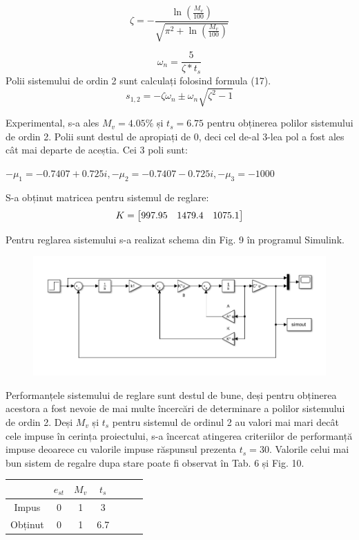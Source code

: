 \documentclass[11pt]{article}
\begin{document}
\begin{equation}
\zeta=-\frac{\ln(\frac{M_v}{100})}{\sqrt{\pi^2+\ln(\frac{M_v}{100})}}
\end{equation}

\begin{equation}
\omega_n=\frac{5}{\zeta\ast t_s}
\end{equation}
Polii sistemului de ordin 2 sunt calculați folosind formula (17).
\begin{equation}
s_{1,2}=-\zeta\omega_{n}\pm\omega_{n}\sqrt{\zeta^2-1}
\end{equation}

Experimental, s-a ales $M_v=4.05\%$ și $t_s=6.75$ pentru obținerea polilor sistemului de ordin 2. Polii sunt destul de apropiați de 0, deci cel de-al 3-lea pol a fost ales cât mai departe de aceștia. Cei 3 poli sunt:
\begin{center}
	$-\mu_1=-0.7407+0.725i,-\mu_2=-0.7407-0.725i,-\mu_3=-1000$
\end{center}
S-a obținut matricea pentru sistemul de reglare:
\begin{align}
K=
\begin{bmatrix}
997.95& 1479.4&1075.1 \notag
\end{bmatrix}
\end{align}

Pentru reglarea sistemului s-a realizat schema din Fig. 9 în programul Simulink.
\begin{figure}[H]
	\centering
	\includegraphics[width=1\linewidth]{stare.png}
	\label{fig:test2}
\end{figure}

Performanțele sistemului de reglare sunt destul de bune, deși pentru obținerea acestora a fost nevoie de mai multe încercări de determinare a polilor sistemului de ordin 2. Deși $M_v$ și $t_s$ 
pentru sistemul de ordinul 2 au valori mai mari decât cele impuse în cerința proiectului, s-a încercat atingerea criteriilor de performanță impuse deoarece cu valorile impuse răspunsul prezenta $t_s=30$. Valorile celui mai bun sistem de regalre dupa stare poate fi observat  în Tab. 6 și Fig. 10.
\begin{center}
	\begin{tabular}{|c|c|c|c|c|c|c|}
		\hline
		&$e_{st}$&$M_v$&$t_s$\\
		\hline
		Impus&0&1&3\\
		\hline
		Obținut&0&1&6.7\\
		\hline
	\end{tabular}
\end{center}
\end{document}
